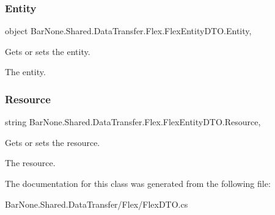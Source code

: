 \subsubsection{\texorpdfstring{Entity}{Entity}}
{\footnotesize\ttfamily object Bar\+None.\+Shared.\+Data\+Transfer.\+Flex.\+Flex\+Entity\+D\+T\+O.\+Entity\hspace{0.3cm}{\ttfamily [get]}, {\ttfamily [set]}}



Gets or sets the entity. 

The entity. \mbox{\label{class_bar_none_1_1_shared_1_1_data_transfer_1_1_flex_1_1_flex_entity_d_t_o_aa11ec43faf9d40bc684370438f77c4dc}} 
\subsubsection{\texorpdfstring{Resource}{Resource}}
{\footnotesize\ttfamily string Bar\+None.\+Shared.\+Data\+Transfer.\+Flex.\+Flex\+Entity\+D\+T\+O.\+Resource\hspace{0.3cm}{\ttfamily [get]}, {\ttfamily [set]}}



Gets or sets the resource. 

The resource. 

The documentation for this class was generated from the following file\+:\begin{DoxyCompactItemize}
\item 
Bar\+None.\+Shared.\+Data\+Transfer/\+Flex/Flex\+D\+T\+O.\+cs\end{DoxyCompactItemize}
